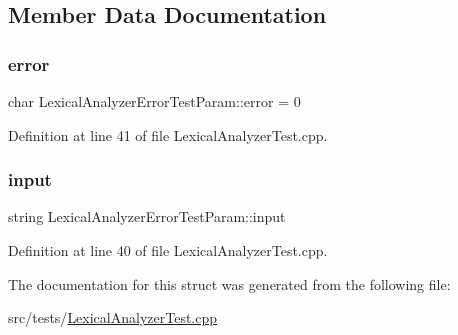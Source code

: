 \subsection{Member Data Documentation}
\mbox{\label{struct_lexical_analyzer_error_test_param_aab37ca9d0544a4299b23e2c77f9c309c}} 
\subsubsection{\texorpdfstring{error}{error}}
{\footnotesize\ttfamily char Lexical\+Analyzer\+Error\+Test\+Param\+::error = \textquotesingle{}0\textquotesingle{}}



Definition at line 41 of file Lexical\+Analyzer\+Test.\+cpp.

\mbox{\label{struct_lexical_analyzer_error_test_param_ab55190d65d3bcaab962dcbe15bd60953}} 
\subsubsection{\texorpdfstring{input}{input}}
{\footnotesize\ttfamily string Lexical\+Analyzer\+Error\+Test\+Param\+::input}



Definition at line 40 of file Lexical\+Analyzer\+Test.\+cpp.



The documentation for this struct was generated from the following file\+:\begin{DoxyCompactItemize}
\item 
src/tests/\hyperlink{_lexical_analyzer_test_8cpp}{Lexical\+Analyzer\+Test.\+cpp}\end{DoxyCompactItemize}
